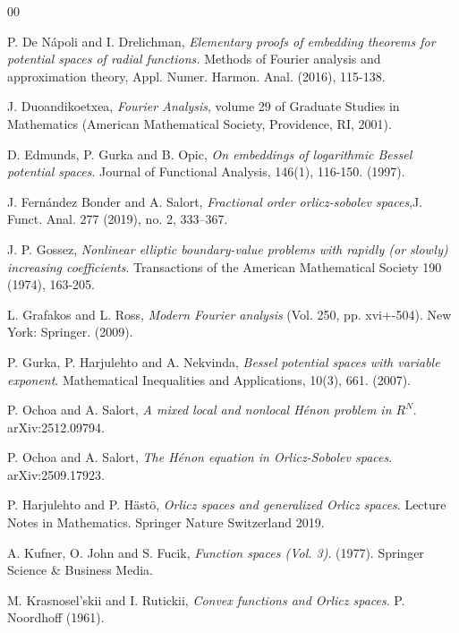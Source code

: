 \documentclass[leqno,twoside, 12pt]{amsart}
\theoremstyle{plain}
\numberwithin{equation}{section} \numberwithin{figure}{section}
\theoremstyle{definition}
\numberwithin{equation}{section}
\begin{document}
\begin{thebibliography}{00}

  P. De N\'apoli and I. Drelichman, \emph{Elementary proofs of embedding theorems for potential spaces of radial functions.} Methods of Fourier analysis and approximation theory, Appl. Numer. Harmon. Anal. (2016), 115-138. 

 J. Duoandikoetxea, \emph{Fourier Analysis}, volume 29 of Graduate Studies in Mathematics
(American Mathematical Society, Providence, RI, 2001).

D. Edmunds, P. Gurka and   B. Opic, \emph{On embeddings of logarithmic Bessel potential spaces}. Journal of Functional Analysis, 146(1), 116-150. (1997).

J. Fern\'andez Bonder and A. Salort, \emph{Fractional order orlicz-sobolev spaces},J. Funct. Anal. 277 (2019), no. 2, 333--367.

 J. P. Gossez, \emph{Nonlinear elliptic boundary-value problems with rapidly (or
slowly) increasing coefficients}. Transactions of the American Mathematical Society 190  (1974), 163-205. 


L. Grafakos and L. Ross, \emph{Modern Fourier analysis} (Vol. 250, pp. xvi+-504). New York: Springer. (2009).

P. Gurka, P. Harjulehto and A. Nekvinda,  \emph{Bessel potential spaces with variable exponent}. Mathematical Inequalities and Applications, 10(3), 661. (2007).

 P. Ochoa and A. Salort, \emph{A mixed local and nonlocal Hénon problem in $R^N$}. arXiv:2512.09794.

 P. Ochoa and A. Salort, \emph{The H\'enon equation in Orlicz-Sobolev spaces}. arXiv:2509.17923.

  P. Harjulehto and P. H\"{a}st\"{o}, \emph{Orlicz spaces and generalized Orlicz spaces}. Lecture Notes in Mathematics. Springer Nature Switzerland 2019.
 

A. Kufner, O. John and S. Fucik,  \emph{Function spaces (Vol. 3)}. (1977). Springer Science \& Business Media.

M. Krasnosel'skii  and I. Rutickii, \emph{Convex functions and Orlicz spaces}. P. Noordhoff (1961).



\end{thebibliography}
\end{document}
